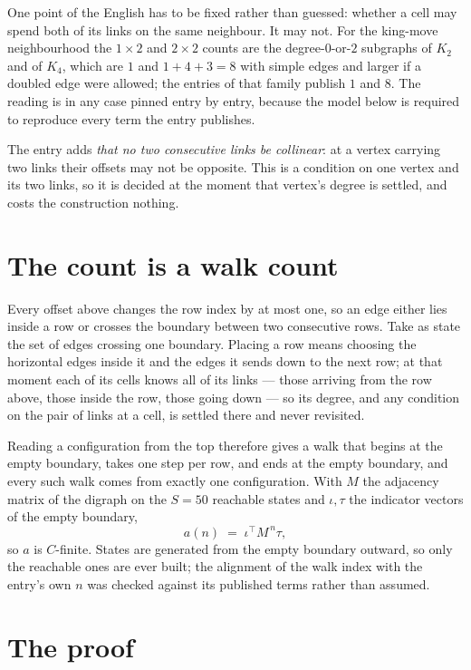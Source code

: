 \documentclass[11pt,a4paper]{article}
\theoremstyle{plain}
\theoremstyle{definition}
\begin{document}
One point of the English has to be fixed rather than guessed: whether a cell may spend both of
its links on the same neighbour. It may not. For the king-move neighbourhood the $1\times2$
and $2\times2$ counts are the degree-$0$-or-$2$ subgraphs of $K_2$ and of $K_4$, which are $1$
and $1+4+3=8$ with simple edges and larger if a doubled edge were allowed; the entries of that
family publish $1$ and $8$. The reading is in any case pinned entry by entry, because the
model below is required to reproduce every term the entry publishes.

The entry adds \emph{that no two consecutive links be collinear}: at a vertex carrying two
links their offsets may not be opposite. This is a condition on one vertex and its two links,
so it is decided at the moment that vertex's degree is settled, and costs the construction
nothing.

\section{The count is a walk count}

Every offset above changes the row index by at most one, so an edge either lies inside a row
or crosses the boundary between two consecutive rows. Take as state the set of edges crossing
one boundary. Placing a row means choosing the horizontal edges inside it and the edges it
sends down to the next row; at that moment each of its cells knows all of its links --- those
arriving from the row above, those inside the row, those going down --- so its degree, and any
condition on the pair of links at a cell, is settled there and never revisited.

Reading a configuration from the top therefore gives a walk that begins at the empty boundary,
takes one step per row, and ends at the empty boundary, and every such walk comes from exactly
one configuration. With $M$ the adjacency matrix of the digraph on the $S=50$ reachable
states and $\iota,\tau$ the indicator vectors of the empty boundary,
\[
a(n)\;=\;\iota^{\!\top}M^{\,n}\tau ,
\]
so $a$ is $C$-finite. States are generated from the empty boundary outward, so only the
reachable ones are ever built; the alignment of the walk index with the entry's own $n$ was
checked against its published terms rather than assumed.

\section{The proof}
\end{document}
